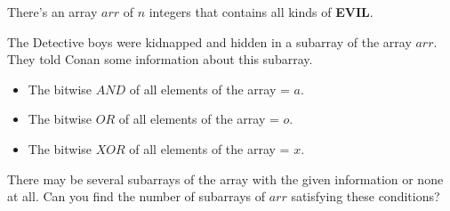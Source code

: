 There's an array $arr$ of $n$ integers that contains all kinds of \textbf{EVIL}.

The Detective boys were kidnapped and hidden in a subarray of the array $arr$. They told Conan some information about this subarray.

\begin{itemize}
\item The bitwise $AND$ of all elements of the array = $a$.
\item The bitwise $OR$ of all elements of the array = $o$.
\item The bitwise $XOR$ of all elements of the array = $x$.
\end{itemize}

There may be several subarrays of the array with the given information or none at all. Can you find the number of subarrays of $arr$ satisfying these conditions?